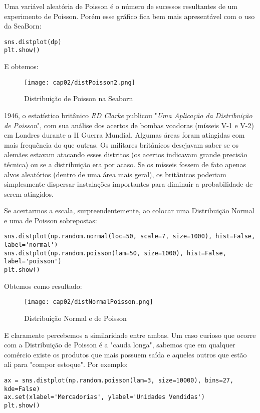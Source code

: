 Uma variável aleatória de Poisson é o número de sucessos resultantes de um experimento de Poisson. Porém esse gráfico fica bem mais apresentável com o uso da SeaBorn:
\begin{lstlisting}
sns.distplot(dp)
plt.show()
\end{lstlisting}

E obtemos:
\begin{figure}[H]
	\centering
	\texttt{[image: cap02/distPoisson2.png]}
	\caption{Distribuição de Poisson na Seaborn}
\end{figure}

\begin{note} 
	1946, o estatístico britânico \textit{RD Clarke} publicou "\textit{Uma Aplicação da Distribuição de Poisson}", com sua análise dos acertos de bombas voadoras (mísseis V-1 e V-2) em Londres durante a II Guerra Mundial. Algumas áreas foram atingidas com mais frequência do que outras. Os militares britânicos desejavam saber se os alemães estavam atacando esses distritos (os acertos indicavam grande precisão técnica) ou se a distribuição era por acaso. Se os mísseis fossem de fato apenas alvos aleatórios (dentro de uma área mais geral), os britânicos poderiam simplesmente dispersar instalações importantes para diminuir a probabilidade de serem atingidos.
\end{note}

Se acertarmos a escala, surpreendentemente, ao colocar uma Distribuição Normal e uma de Poisson sobrepostas:
\begin{lstlisting}
sns.distplot(np.random.normal(loc=50, scale=7, size=1000), hist=False, label='normal')
sns.distplot(np.random.poisson(lam=50, size=1000), hist=False, label='poisson')
plt.show() 
\end{lstlisting}

Obtemos como resultado:
\begin{figure}[H]
	\centering
	\texttt{[image: cap02/distNormalPoisson.png]}
	\caption{Distribuição Normal e de Poisson}
\end{figure}

E claramente percebemos a similaridade entre ambas. Um caso curioso que ocorre com a Distribuição de Poisson é a "cauda longa", sabemos que em qualquer comércio existe os produtos que mais possuem saída e aqueles outros que estão ali para "compor estoque". Por exemplo:
\begin{lstlisting}
ax = sns.distplot(np.random.poisson(lam=3, size=10000), bins=27, kde=False)
ax.set(xlabel='Mercadorias', ylabel='Unidades Vendidas')
plt.show()
\end{lstlisting}

